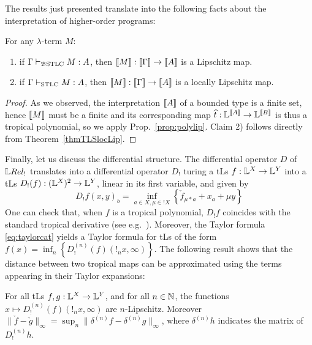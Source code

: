 The results just presented translate into the following facts about the interpretation of higher-order programs:
\begin{corollary}
For any $\lambda$-term $M$:
\begin{enumerate}
\item if $\Gamma \vdash_{\mathcal{B}\mathrm{STLC}} M:A$, then $\llbracket M\rrbracket:\llbracket\Gamma\rrbracket \to \llbracket A\rrbracket$ is a Lipschitz map.
\item if $\Gamma \vdash_{\mathrm{STLC}}M:A$, then $\llbracket M\rrbracket: \llbracket\Gamma\rrbracket \to \llbracket A\rrbracket$ is a locally Lipschitz map.
\end{enumerate}
\end{corollary} 
\begin{proof}
As we observed, the interpretation $\llbracket A\rrbracket$ of a bounded type is a finite set, hence $\llbracket M\rrbracket$ must be a finite  and  its corresponding map $\widehat t:\mathbb{L}^{\llbracket A\rrbracket} \to \mathbb{L}^{\llbracket B\rrbracket}$ is thus a tropical polynomial, so we apply Prop.~\ref{prop:polylip}.
Claim 2) follows directly from Theorem~\ref{thmTLSlocLip}.
\end{proof}


Finally, let us discuss the differential structure. The differential operator $D$ of $\LREL_{!}$ translates into a differential operator $D_{!}$ turing a tLs $f:\mathbb{L}^{X}\to \mathbb{L}^{Y}$ into a tLs $D_{!}(f):(\mathbb{L}^{X})^{2}\to \mathbb{L}^{Y}$, linear in its first variable, and given by 
\begin{equation}
D_{!}f(x,y)_{b}=\inf_{a\in X, \mu\in !X}\left\{\check f_{\mu*a}+x_{a}+\mu y\right\}
\end{equation}
One can check that, when $f$ is a tropical polynomial, $D_{!}f$ coincides with the standard tropical derivative (see e.g.~\cite{Grigoriev2017}).
Moreover, the Taylor formula \eqref{eq:taylorcat} yields 
a Taylor formula for tLs of the form 
$f(x)=\inf_{n}\left\{D_{!}^{(n)}(f)(!_{n}x,\infty)\right\}$.
The following result shows that the distance between two tropical maps can be approximated using the terms appearing in their Taylor expansions:
\begin{proposition}
For all tLs $f,g: \mathbb{L}^{X}\to \mathbb{L}^{Y}$, and for all $n\in \mathbb{N}$, 
the functions $x\mapsto D_{!}^{(n)}(f)(!_{n}x,\infty)$ are $n$-Lipschitz. Moreover 
$\| \check f-\check g\|_{\infty}= \sup_{n} \| {\delta^{(n)}f}- {\delta^{(n)}g}\|_{\infty}$, 
where $\delta^{(n)}h$ indicates the matrix of $D_{!}^{(n)}h$.
\end{proposition} 


